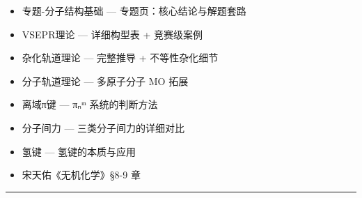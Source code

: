 \begin{itemize}
\tightlist
\item
  专题-分子结构基础 --- 专题页：核心结论与解题套路
\item
  VSEPR理论 --- 详细构型表 + 竞赛级案例
\item
  杂化轨道理论 --- 完整推导 + 不等性杂化细节
\item
  分子轨道理论 --- 多原子分子 MO 拓展
\item
  离域π键 --- πₙᵐ 系统的判断方法
\item
  分子间力 --- 三类分子间力的详细对比
\item
  氢键 --- 氢键的本质与应用
\item
  宋天佑《无机化学》§8-9 章
\end{itemize}

\begin{center}\rule{0.5\linewidth}{0.5pt}\end{center}
